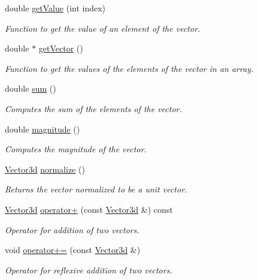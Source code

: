 \begin{DoxyCompactItemize}
double \hyperlink{classVector3d_a37055dde72eed6770cf3b2b11b56f0f8}{get\-Value} (int index)
\begin{DoxyCompactList}\small\item\em \-Function to get the value of an element of the vector. \end{DoxyCompactList}\item 
double $\ast$ \hyperlink{classVector3d_a12ca89ab46c79eb78fa6b75cad1a3616}{get\-Vector} ()
\begin{DoxyCompactList}\small\item\em \-Function to get the values of the elements of the vector in an array. \end{DoxyCompactList}\item 
double \hyperlink{classVector3d_a76fa7fc5a86ba77a6764eb0d9072e90a}{sum} ()
\begin{DoxyCompactList}\small\item\em \-Computes the sum of the elements of the vector. \end{DoxyCompactList}\item 
double \hyperlink{classVector3d_a9fd3cba8bbdf983db6c2a2eae00c4b29}{magnitude} ()
\begin{DoxyCompactList}\small\item\em \-Computes the magnitude of the vector. \end{DoxyCompactList}\item 
\hyperlink{classVector3d}{\-Vector3d} \hyperlink{classVector3d_a24acba00068d9d1612404243f2a01078}{normalize} ()
\begin{DoxyCompactList}\small\item\em \-Returns the vector normalized to be a unit vector. \end{DoxyCompactList}\item 
\hyperlink{classVector3d}{\-Vector3d} \hyperlink{classVector3d_ad714ad56910f370335c18262dc5cc13a}{operator+} (const \hyperlink{classVector3d}{\-Vector3d} \&) const 
\begin{DoxyCompactList}\small\item\em \-Operator for addition of two vectors. \end{DoxyCompactList}\item 
void \hyperlink{classVector3d_a034e9f847d613c9cba1cb47202b8143a}{operator+=} (const \hyperlink{classVector3d}{\-Vector3d} \&)
\begin{DoxyCompactList}\small\item\em \-Operator for reflexive addition of two vectors. \end{DoxyCompactList}\item 

\end{DoxyCompactItemize}
